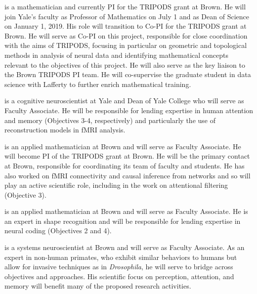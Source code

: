  is a mathematician and currently PI for the
TRIPODS grant at Brown. He will join Yale's faculty as
Professor of Mathematics on July 1 and as Dean of Science on January 1, 2019. His
role will transition to Co-PI for the TRIPODS grant at Brown. He will serve as
Co-PI on this project, responsible for close coordination with the aims of
TRIPODS, focusing in particular on geometric and topological methods in analysis
of neural data and identifying mathematical concepts relevant to the objectives 
of this project. He will also serve as the key liaison to the Brown
TRIPODS PI team. He will co-supervise the graduate student in data
science with Lafferty to further enrich mathematical training.

 is a cognitive neuroscientist at Yale and Dean of Yale
College who will serve as Faculty Associate. He will be responsible for lending
expertise in human attention and memory (Objectives 3-4, respectively) and
particularly the use of reconstruction models in fMRI analysis.

 is an applied mathematician at Brown and will serve as
Faculty Associate. He will become PI of the TRIPODS grant at Brown. He will
be the primary contact at Brown, responsible for coordinating its
team of faculty and students. He has also worked on fMRI connectivity
and causal inference from networks and so will play an active
scientific role, including in the work on attentional filtering (Objective 3).

 is an applied mathematician at Brown and will serve as
Faculty Associate. He is an expert in shape recognition and will be responsible for lending expertise in neural coding (Objectives 2 and 4).

 is a systems neuroscientist at Brown and will serve as
Faculty Associate. As an expert in non-human primates, who exhibit
similar behaviors to humans but allow for invasive techniques as in
{\it Drosophila}, he will serve to bridge across objectives and
approaches. His scientific focus on perception, attention, and memory
will benefit many of the proposed research activities.

